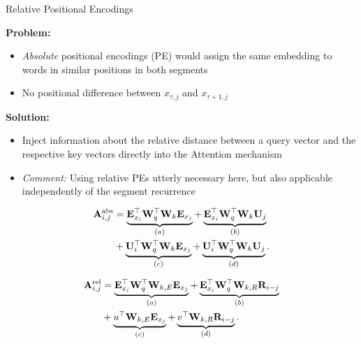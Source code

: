 \begin{vbframe}{Relative Positional Encodings}

\vfill

\textbf{Problem:}

\begin{itemize}
	\item \textit{Absolute} positional encodings (PE) would assign the same embedding to words in similar positions in both segments
	\item No positional difference between $x_{\tau,j}$ and $x_{\tau+1,j}$
\end{itemize}

\textbf{Solution:}

\begin{itemize}
	\item Inject information about the relative distance between a query vector and the respective key vectors directly into the Attention mechanism
	\item \textit{Comment:} Using relative PEs utterly necessary here, but also applicable independently of the segment recurrence
\end{itemize}

\begin{align*}
	\rmA_{i,j}^\text{abs}
	&= \underbrace{ \rmE_{x_i}^\top \rmW_q^\top \rmW_k \rmE_{x_j} }_{(a)}
	+ \underbrace{\rmE_{x_i}^\top \rmW_q^\top \rmW_k \rmU_{j}}_{(b)} \\
	&+ \underbrace{\rmU_{i}^\top \rmW_q^\top \rmW_k \rmE_{x_j}}_{(c)}
	+ \underbrace{\rmU_{i}^\top \rmW_q^\top \rmW_k \rmU_{j}}_{(d)}. \vspace{-0.5em}
\end{align*}

\begin{align*}
	{\mathbf{A}}_{i,j}^\text{rel}
	&= \underbrace{ {\mathbf{E}}_{x_i}^\top {\mathbf{W}}_q^\top {\mathbf{W}}_{k,E} {\mathbf{E}}_{x_j} }_{(a)}
	+ \underbrace{{\mathbf{E}}_{x_i}^\top {\mathbf{W}}_q^\top {\mathbf{W}}_{k,R} {\mathbf{R}}_{i-j} }_{(b)} \\
	&+ \underbrace{u^\top {\mathbf{W}}_{k,E} {\mathbf{E}}_{x_j}}_{(c)}
	+ \underbrace{v^\top {\mathbf{W}}_{k,R} {\mathbf{R}}_{i-j}}_{(d)}.
\end{align*}

\end{vbframe}

